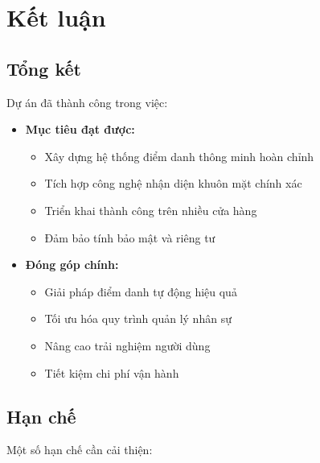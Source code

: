 \section{Kết luận}

\subsection{Tổng kết}
\hspace{0.5cm}Dự án đã thành công trong việc:

\begin{itemize}
    \item \textbf{Mục tiêu đạt được:}
    \begin{itemize}
        \item Xây dựng hệ thống điểm danh thông minh hoàn chỉnh
        \item Tích hợp công nghệ nhận diện khuôn mặt chính xác
        \item Triển khai thành công trên nhiều cửa hàng
        \item Đảm bảo tính bảo mật và riêng tư
    \end{itemize}
    
    \item \textbf{Đóng góp chính:}
    \begin{itemize}
        \item Giải pháp điểm danh tự động hiệu quả
        \item Tối ưu hóa quy trình quản lý nhân sự
        \item Nâng cao trải nghiệm người dùng
        \item Tiết kiệm chi phí vận hành
    \end{itemize}
\end{itemize}

\subsection{Hạn chế}
\hspace{0.5cm}Một số hạn chế cần cải thiện:

